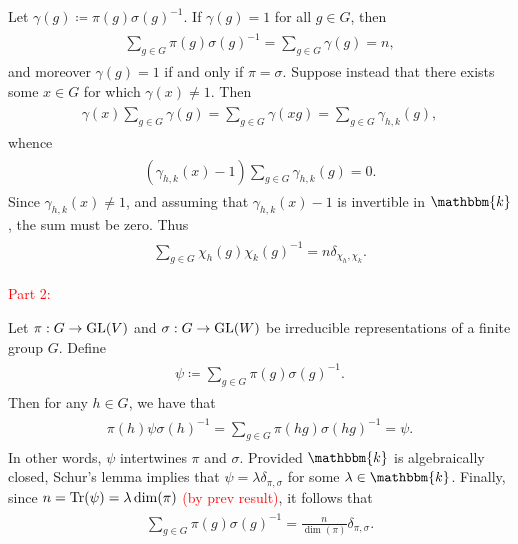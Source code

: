 \noindent Let $\gamma(g) \coloneqq \pi(g)\sigma(g)^{-1}$. If $\gamma(g) = 1$ for all $g \in G$, then
\begin{align*}
\begin{split}
\sum_{g \in G} \pi(g)\sigma(g)^{-1} = \sum_{g \in G} \gamma(g) = n,
\end{split}
\end{align*}
\noindent and moreover $\gamma(g) = 1$ if and only if $\pi = \sigma$. Suppose instead that there exists some $x \in G$ for which $\gamma(x) \neq 1$. Then
\begin{align*}
\begin{split}
\gamma(x)\sum_{g \in G}\gamma(g) = \sum_{g \in G}\gamma(xg) = \sum_{g \in G} \gamma_{h,k}(g),
\end{split}
\end{align*}
\noindent whence
\begin{align*}
\begin{split}
(\gamma_{h,k}(x) - 1)\sum_{g \in G}\gamma_{h,k}(g) = 0.
\end{split}
\end{align*}
\noindent Since $\gamma_{h,k}(x) \neq 1$, and assuming that $\gamma_{h,k}(x) - 1$ is invertible in $\mathbbm{k}$, the sum must be zero. Thus
\begin{align*}
\begin{split}
\sum_{g \in G}\chi_h(g)\chi_k(g)^{-1} = n\delta_{\chi_h,\chi_k}.
\end{split}
\end{align*}

\noindent\textcolor{red}{Part 2:}

\noindent Let $\pi : G \to \textup{GL}(V)$ and $\sigma : G \to \textup{GL}(W)$ be irreducible representations of a finite group $G$. Define
\begin{align*}
\begin{split}
\psi \coloneqq \sum_{g \in G} \pi(g)\sigma(g)^{-1}.
\end{split}
\end{align*}
\noindent Then for any $h \in G$, we have that
\begin{align*}
\begin{split}
\pi(h)\psi\sigma(h)^{-1} = \sum_{g \in G} \pi(hg)\sigma(hg)^{-1} = \psi.
\end{split}
\end{align*}
\noindent In other words, $\psi$ intertwines $\pi$ and $\sigma$. Provided $\mathbbm{k}$ is algebraically closed, Schur's lemma implies that $\psi = \lambda\delta_{\pi,\sigma}$ for some $\lambda \in \mathbbm{k}$. Finally, since $n = \textup{Tr}(\psi) = \lambda\dim(\pi)$ \textcolor{red}{(by prev result)}, it follows that
\begin{align*}
\begin{split}
\sum_{g \in G} \pi(g)\sigma(g)^{-1} = \frac{n}{\dim(\pi)}\delta_{\pi,\sigma}.
\end{split}
\end{align*}

